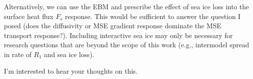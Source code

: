 \documentclass{article}
\begin{document}
Alternatively, we can use the \cite{hwang2010} EBM and prescribe the effect of sea ice loss into the surface heat flux $F_s$ response. This would be sufficient to answer the question I posed (does the diffusivity or MSE gradient response dominate the MSE transport response?). Including interactive sea ice may only be necessary for research questions that are beyond the scope of this work (e.g., intermodel spread in rate of $R_1$ and sea ice loss).

I'm interested to hear your thoughts on this. 



\end{document}
